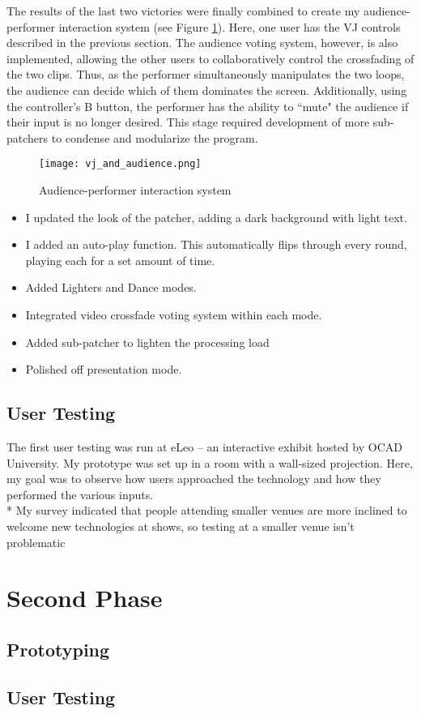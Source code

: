 The results of the last two victories were finally combined to create my audience-performer interaction system (see Figure \ref{prototyping6}). Here, one user has the VJ controls described in the previous section. The audience voting system, however, is also implemented, allowing the other users to collaboratively control the crossfading of the two clips. Thus, as the performer simultaneously manipulates the two loops, the audience can decide which of them dominates the screen. Additionally, using the controller's B button, the performer has the ability to ``mute" the audience if their input is no longer desired. This stage required development of more sub-patchers to condense and modularize the program.

\begin{figure}[t]
	\centering

	\texttt{[image: vj\_and\_audience.png]}
	\caption{Audience-performer interaction system}

	\label{prototyping6}
\end{figure}

\begin{itemize}
	\item I updated the look of the patcher, adding a dark background with light text.
	\item I added an auto-play function. This automatically flips through every round, playing each for a set amount of time.
	\item Added Lighters and Dance modes.
	\item Integrated video crossfade voting system within each mode.
	\item Added sub-patcher to lighten the processing load
	\item Polished off presentation mode.
\end{itemize}


\subsection{User Testing}

The first user testing was run at eLeo -- an interactive exhibit hosted by OCAD University. My prototype was set up in a room with a wall-sized projection. Here, my goal was to observe how users approached the technology and how they performed the various inputs.\\

* My survey indicated that people attending smaller venues are more inclined to welcome new technologies at shows, so testing at a smaller venue isn't problematic


\section{Second Phase}

\subsection{Prototyping}

\subsection{User Testing}